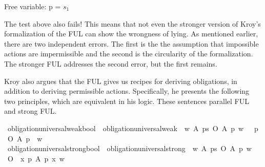 \begin{isabellebody}
{  Free variable:
    p = $s_1$
\color{black}%
}%
\endisatagproof
{\isafoldproof}%
%
\isadelimproof
%
\endisadelimproof
%
\begin{isamarkuptext}%
The test above also fails! This means that not even the stronger version of Kroy's formalization
        of the FUL can show the wrongness of lying. As mentioned earlier, there are two independent errors. The first is the 
        the assumption that impossible actions are impermissible and the second is the circularity of the 
        formalization. The stronger FUL addresses the second error, but the first remains.%
\end{isamarkuptext}\isamarkuptrue%
%
\begin{isamarkuptext}%
Kroy also argues that the FUL gives us recipes for deriving obligations, in addition to deriving
        permissible actions. Specifically, he presents the following two principles, which are equivalent 
        in his logic. These sentences parallel FUL and strong FUL.%
\end{isamarkuptext}\isamarkuptrue%
\isamarkupfalse%
\ obligation{\isacharunderscore}universal{\isacharunderscore}weak{\isacharcolon}{\isacharcolon}bool\ \ {\isachardoublequoteopen}obligation{\isacharunderscore}universal{\isacharunderscore}weak\ {\isasymequiv}\ {\isasymforall}w\ A{\isachardot}\ {\isacharparenleft}{\isacharparenleft}{\isasymexists}p{\isacharcolon}{\isacharcolon}s{\isachardot}\ {\isacharparenleft}{\isacharparenleft}O\ {\isacharbraceleft}A\ p{\isacharbraceright}{\isacharparenright}\ w{\isacharparenright}{\isacharparenright}\ \ {\isasymlongrightarrow}{\isacharparenleft}\ {\isacharparenleft}{\isasymforall}p{\isachardot}\ {\isacharparenleft}\ O\ {\isacharbraceleft}A\ p\ {\isacharbraceright}{\isacharparenright}\ w{\isacharparenright}{\isacharparenright}{\isacharparenright}{\isachardoublequoteclose}\isanewline
{}\isamarkupfalse%
\ obligation{\isacharunderscore}universal{\isacharunderscore}strong{\isacharcolon}{\isacharcolon}bool\ \ {\isachardoublequoteopen}obligation{\isacharunderscore}universal{\isacharunderscore}strong\ {\isasymequiv}\ {\isasymforall}w\ A{\isachardot}\ {\isacharparenleft}{\isacharparenleft}{\isasymexists}p{\isacharcolon}{\isacharcolon}s{\isachardot}\ {\isacharparenleft}{\isacharparenleft}O\ {\isacharbraceleft}A\ p{\isacharbraceright}{\isacharparenright}\ w{\isacharparenright}{\isacharparenright}\ \ {\isasymlongrightarrow}{\isacharparenleft}\ {\isacharparenleft}{\isacharparenleft}\ O\ {\isacharbraceleft}\ {\isasymlambda}x{\isachardot}\ {\isasymforall}p{\isachardot}\ A\ p\ x{\isacharbraceright}{\isacharparenright}\ w{\isacharparenright}{\isacharparenright}{\isacharparenright}{\isachardoublequoteclose}\isanewline

\end{isabellebody}
